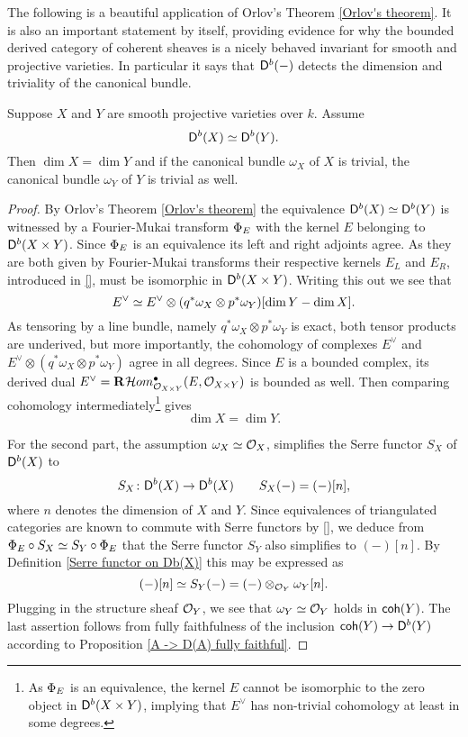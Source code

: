 The following is a beautiful application of Orlov's Theorem \ref{Orlov's theorem}. It is also an important statement by itself, providing evidence for why the bounded derived category of coherent sheaves is a nicely behaved invariant for smooth and projective varieties. In particular it says that $\mathsf{D}^b(-)$ detects the dimension and triviality of the canonical bundle.  
\begin{theorem}
    \label{Db detects dimension and triviality of canonical bundle}
    Suppose $X$ and $Y$ are smooth projective varieties over $k$. Assume
    \[
        \mathsf{D}^b(X) \simeq \mathsf{D}^b(Y).
    \]
    Then $\dim X = \dim Y$ and if the canonical bundle $\omega_X$ of $X$ is trivial, the canonical bundle $\omega_Y$ of $Y$ is trivial as well.
\end{theorem}

\begin{proof}
    By Orlov's Theorem \ref{Orlov's theorem} the equivalence $\mathsf{D}^b(X) \simeq \mathsf{D}^b(Y)$ is witnessed by a Fourier-Mukai transform $\Phi_{E}$ with the kernel $E$ belonging to $\mathsf{D}^b(X \times Y)$. Since $\Phi_{E}$ is an equivalence its left and right adjoints agree. As they are both given by Fourier-Mukai transforms their respective kernels $E_L$ and $E_R$, introduced in \ref{}, must be isomorphic in $\mathsf{D}^b(X \times Y)$. Writing this out we see that
    \[
        E^\vee \simeq E^\vee \otimes (q^*\omega_X \otimes p^*\omega_Y)[\dim Y - \dim X].
    \]
    As tensoring by a line bundle, namely $q^*\omega_X \otimes p^*\omega_Y$ is exact, both tensor products are underived, but more importantly, the cohomology of complexes $E^\vee$ and ${E^\vee \otimes (q^*\omega_X \otimes p^*\omega_Y)}$ agree in all degrees. Since $E$ is a bounded complex, its derived dual $E^\vee = \rderived{}{\localhom[X \times Y]^\bullet(E, \struct{X \times Y})}$ is bounded as well. Then comparing cohomology intermediately\footnote{As $\Phi_{E}$ is an equivalence, the kernel $E$ cannot be isomorphic to the zero object in $\mathsf{D}^b(X \times Y)$, implying that $E^\vee$ has non-trivial cohomology at least in some degrees.} gives 
    \[
        \dim X = \dim Y.
    \]
    
    For the second part, the assumption $\omega_X \simeq {\mathcal{O}_{X}}$, simplifies the Serre functor $S_X$ of $\mathsf{D}^b(X)$ to 
    \[
        S_X \colon \mathsf{D}^b(X) \to \mathsf{D}^b(X) \qquad S_X(-) = (-)[n], 
    \]
    where $n$ denotes the dimension of $X$ and $Y$. Since equivalences of triangulated categories are known to commute with Serre functors by \ref{}, we deduce from $\Phi_{E} \circ S_X \simeq S_Y \circ \Phi_{E}$ that the Serre functor $S_Y$ also simplifies to $(-)[n]$. By Definition \ref{Serre functor on Db(X)} this may be expressed as
    \[
        (-)[n] \simeq S_Y(-) = (-) \otimes_{{\mathcal{O}_{Y}}} \omega_Y[n].
    \]
    Plugging in the structure sheaf ${\mathcal{O}_{Y}}$, we see that $\omega_Y \simeq {\mathcal{O}_{Y}}$ holds in $\mathsf{coh}(Y)$. The last assertion 
    follows from fully faithfulness of the inclusion $\mathsf{coh}(Y) \to \mathsf{D}^b(Y)$ according to Proposition \ref{A -> D(A) fully faithful}. 
\end{proof}

